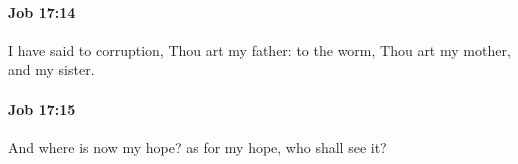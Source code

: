 		\paragraph{Job 17:14} %
			\label{JOB-17-14}

			I have said to corruption, Thou art my father: to the worm, Thou art my mother, and my sister.


		\paragraph{Job 17:15} %
			\label{JOB-17-15}

			And where is now my hope? as for my hope, who shall see it?


